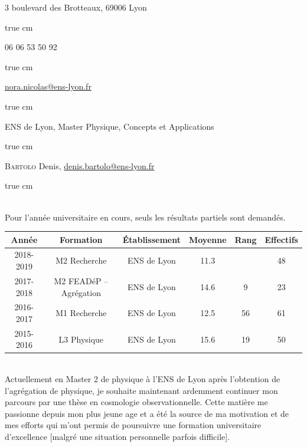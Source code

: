 \documentclass[11pt,a4]{article}
\begin{document}

3 boulevard des Brotteaux, 69006 Lyon

 true cm

06 06 53 50 92

 true cm

\href{mailto:nora.nicolas@ens-lyon.fr}{nora.nicolas@ens-lyon.fr}

 true cm

ENS de Lyon, Master Physique, Concepts et Applications

 true cm

\textsc{Bartolo} Denis, \href{mailto:denis.bartolo@ens-lyon.fr}{denis.bartolo@ens-lyon.fr}

 true cm

 \\ Pour l'année universitaire en cours, seuls les résultats
partiels sont demandés.

\begin{center}
    \begin{tabular}{|c|c|c|c|c|c|} \cline{1-6}
        Année     & Formation               & Établissement & Moyenne & Rang & Effectifs \\ \hline
        2018-2019 & M2 Recherche            & ENS de Lyon   & 11.3    &      & 48 \\ \hline
        2017-2018 & M2 FEADéP -- Agrégation & ENS de Lyon   & 14.6    & 9    & 23 \\ \hline
        2016-2017 & M1 Recherche            & ENS de Lyon   & 12.5    & 56   & 61 \\ \hline
        2015-2016 & L3 Physique             & ENS de Lyon   & 15.6    & 19   & 50 \\ \hline
    \end{tabular}
\end{center}

\newpage
{}\\

Actuellement en Master 2 de physique à l'ENS de Lyon après
l'obtention de l'agrégation de  physique, je souhaite maintenant 
ardemment  continuer mon parcours par une thèse 
en cosmologie observationnelle. Cette matière me passionne depuis mon
plus jeune age et a été la source de ma motivation et de mes efforts
qui m'ont permis de poursuivre une formation universitaire
d'excellence [malgré une situation personnelle parfois difficile]. 
\end{document}
